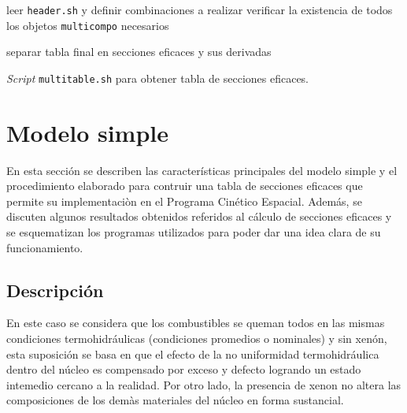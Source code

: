 \documentclass[11pt]{article}
\begin{document}
\begin{algorithm}[H]
 
 
 leer \texttt{header.sh} y definir combinaciones a realizar\;
 verificar la existencia de todos los objetos \texttt{multicompo} necesarios\;
 
 
 separar tabla final en secciones eficaces y sus derivadas\;
 \caption{\emph{Script} \texttt{multitable.sh} para obtener tabla de secciones eficaces.\label{algo:multitabla-detallada}}
\end{algorithm}


\section{Modelo simple}
\label{sec:modelo-clasico}

En esta sección se describen las características principales del modelo simple y el procedimiento elaborado para contruir una tabla de secciones eficaces que permite su implementaciòn en el Programa Cinético Espacial. Además, se discuten algunos resultados obtenidos referidos al cálculo de secciones eficaces y se esquematizan los programas utilizados para poder dar una idea clara de su funcionamiento.

\subsection{Descripción}

En este caso se considera que los combustibles se queman todos en las mismas condiciones termohidráulicas (condiciones promedios o nominales) y sin xenón, esta suposición se basa en que el efecto de la no uniformidad termohidráulica dentro del núcleo es compensado por exceso y defecto logrando un estado intemedio cercano a la realidad. Por otro lado, la presencia de xenon no altera las composiciones de los demàs materiales del núcleo en forma sustancial.
\end{document}
